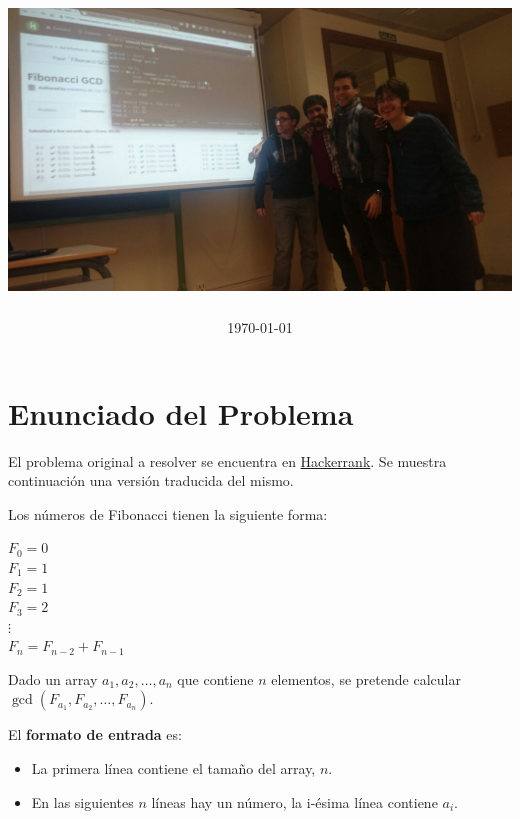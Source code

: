 \documentclass{article}
\title{                                             %
    \textmd{\textbf{\asignatura \\ \titulo}} \\         %
    \vspace{2cm}
    \includegraphics[width=15.5cm]{FibonacciGCD.jpg}    %
    \vspace{1cm}
}
\author{\textbf{\autor}}                            %
\date{\today}                                       %
\theoremstyle{theorem-style}  %
\theoremstyle{definition}
\theoremstyle{example-style}
\begin{document}
\maketitle

\makeatletter\renewcommand{\ALG@name}{Algoritmo}
\renewcommand{\listalgorithmname}{Lista de \ALG@name s} \makeatother



\newpage

\section*{Enunciado del Problema}
    El problema original a resolver se encuentra en \href{https://www.hackerrank.com/contests/infinitum9/challenges/fibonacci-gcd}{Hackerrank}. Se muestra  continuación una versión traducida del mismo.
    
    Los números de Fibonacci tienen la siguiente forma:
    
    \begin{center}
        $F_0 = 0$\\
        $F_1 = 1$\\
        $F_2 = 1$\\
        $F_3 = 2$\\
        $\vdots$\\
        $F_n = F_{n-2} + F_{n-1}$
    \end{center}
    
    Dado un array $a_1,a_2,\dots,a_n$ que contiene $n$ elementos, se pretende calcular $\gcd(F_{a_1},F_{a_2},\dots,F_{a_n})$.
    
    El \textbf{formato de entrada} es:
    \begin{itemize}
        \item La primera línea contiene el tamaño del array, $n$.
        \item En las siguientes $n$ líneas hay un número, la i-ésima línea contiene $a_i$.
    \end{itemize} 
    
\end{document}
